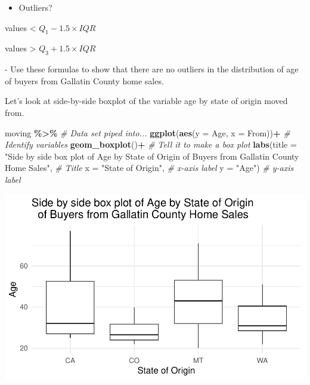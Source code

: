 \documentclass[
]{report}
\newenvironment{Shaded}{\begin{snugshade}}{\end{snugshade}}
\newcommand{\AttributeTok}[1]{\textcolor[rgb]{0.13,0.29,0.53}{#1}}
\newcommand{\CommentTok}[1]{\textcolor[rgb]{0.56,0.35,0.01}{\textit{#1}}}
\newcommand{\FunctionTok}[1]{\textcolor[rgb]{0.13,0.29,0.53}{\textbf{#1}}}
\newcommand{\NormalTok}[1]{#1}
\newcommand{\SpecialCharTok}[1]{\textcolor[rgb]{0.81,0.36,0.00}{\textbf{#1}}}
\newcommand{\StringTok}[1]{\textcolor[rgb]{0.31,0.60,0.02}{#1}}
\providecommand{\tightlist}{%
  \setlength{\itemsep}{0pt}\setlength{\parskip}{0pt}}
\newcommand{\rgi}{\hspace{24pt}}  %
\begin{document}
\vspace{0.3in}

\begin{itemize}
\tightlist
\item
  Outliers?
\end{itemize}

\rgi values \textless{} \(Q_1 - 1.5 \times IQR\)

\rgi values \textgreater{} \(Q_3 + 1.5 \times IQR\)

\rgi \rgi - Use these formulas to show that there are no outliers in the distribution of age of buyers from Gallatin County home sales.

\vspace{0.8in}
\newpage

Let's look at side-by-side boxplot of the variable age by state of origin moved from.

\begin{Shaded}
\begin{Highlighting}[]
\NormalTok{moving }\SpecialCharTok{\%\textgreater{}\%}  \CommentTok{\# Data set piped into...}
  \FunctionTok{ggplot}\NormalTok{(}\FunctionTok{aes}\NormalTok{(}\AttributeTok{y =}\NormalTok{ Age, }\AttributeTok{x =}\NormalTok{ From))}\SpecialCharTok{+}  \CommentTok{\# Identify variables}
  \FunctionTok{geom\_boxplot}\NormalTok{()}\SpecialCharTok{+}  \CommentTok{\# Tell it to make a box plot}
  \FunctionTok{labs}\NormalTok{(}\AttributeTok{title =} \StringTok{"Side by side box plot of Age by State of Origin }
\StringTok{  of Buyers from Gallatin County Home Sales"}\NormalTok{,  }\CommentTok{\# Title}
       \AttributeTok{x =} \StringTok{"State of Origin"}\NormalTok{,    }\CommentTok{\# x{-}axis label}
       \AttributeTok{y =} \StringTok{"Age"}\NormalTok{)  }\CommentTok{\# y{-}axis label}
\end{Highlighting}
\end{Shaded}

\begin{center}\includegraphics[width=0.85\linewidth]{03-LN03-EDA_files/figure-latex/unnamed-chunk-20-1} \end{center}
\end{document}
